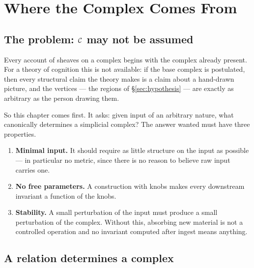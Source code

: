 %

\chapter{Where the Complex Comes From}\label{ch:ingest}

\section{The problem: $\mathcal{C}$ may not be assumed}

Every account of sheaves on a complex begins with the complex already
present. For a theory of cognition this is not available: if the base complex
is postulated, then every structural claim the theory makes is a claim about
a hand-drawn picture, and the vertices --- the regions of
\S\ref{sec:hypothesis} --- are exactly as arbitrary as the person drawing
them.

So this chapter comes first. It asks: given input of an arbitrary nature,
what canonically determines a simplicial complex? The answer wanted must have
three properties.

\begin{enumerate}[label=(P\arabic*)]
  \item\label{P1} \textbf{Minimal input.} It should require as little structure
    on the input as possible --- in particular no metric, since there is no
    reason to believe raw input carries one.
  \item\label{P2} \textbf{No free parameters.} A construction with knobs makes
    every downstream invariant a function of the knobs.
  \item\label{P3} \textbf{Stability.} A small perturbation of the input must
    produce a small perturbation of the complex. Without this, absorbing new
    material is not a controlled operation and no invariant computed after
    ingest means anything.
\end{enumerate}

\section{A relation determines a complex}

